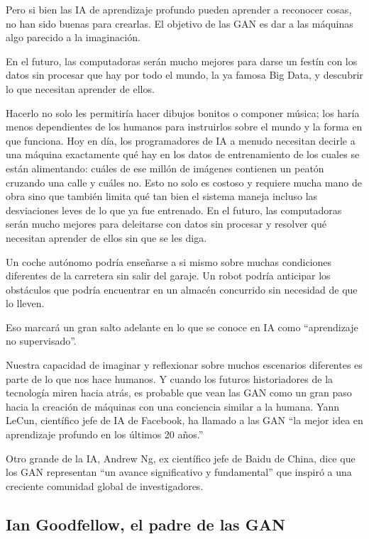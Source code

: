 \documentclass[a4paper]{article}
\begin{document}
Pero si bien las IA de aprendizaje profundo pueden aprender a reconocer cosas, no han 
sido buenas para crearlas. El objetivo de las GAN es dar a las máquinas algo parecido 
a la imaginación.

En el futuro, las computadoras serán mucho mejores para darse un festín con los datos 
sin procesar que hay por todo el mundo, la ya famosa Big Data, y descubrir lo que 
necesitan aprender de ellos.

Hacerlo no solo les permitiría hacer dibujos bonitos o componer música; los haría menos 
dependientes de los humanos para instruirlos sobre el mundo y la forma en que funciona. 
Hoy en día, los programadores de IA a menudo necesitan decirle a una máquina exactamente 
qué hay en los datos de entrenamiento de los cuales se están alimentando: cuáles de ese 
millón de imágenes contienen un peatón cruzando una calle y cuáles no. Esto no solo es 
costoso y requiere mucha mano de obra sino que también limita qué tan bien el sistema
maneja incluso las desviaciones leves de lo que ya fue entrenado. En el futuro, las 
computadoras serán mucho mejores para deleitarse con datos sin procesar y resolver qué 
necesitan aprender de ellos sin que se les diga.

Un coche autónomo podría enseñarse a si mismo sobre muchas condiciones diferentes de la 
carretera sin salir del garaje. Un robot podría anticipar los obstáculos que podría encuentrar 
en un almacén concurrido sin necesidad de que lo lleven.

Eso marcará un gran salto adelante en lo que se conoce en IA como ``aprendizaje no supervisado''.

Nuestra capacidad de imaginar y reflexionar sobre muchos escenarios diferentes es parte 
de lo que nos hace humanos. Y cuando los futuros historiadores de la tecnología miren hacia 
atrás, es probable que vean las GAN como un gran paso hacia la creación de máquinas con una 
conciencia similar a la humana. Yann LeCun, científico jefe de IA de Facebook, ha llamado a 
las GAN ``la mejor idea en aprendizaje profundo en los últimos 20 años.'' 

Otro grande de la IA, Andrew Ng, ex científico jefe de Baidu de China, dice que los GAN 
representan ``un avance significativo y fundamental'' que inspiró a una creciente comunidad 
global de investigadores.

\subsection{Ian Goodfellow, el padre de las GAN}
\end{document}
